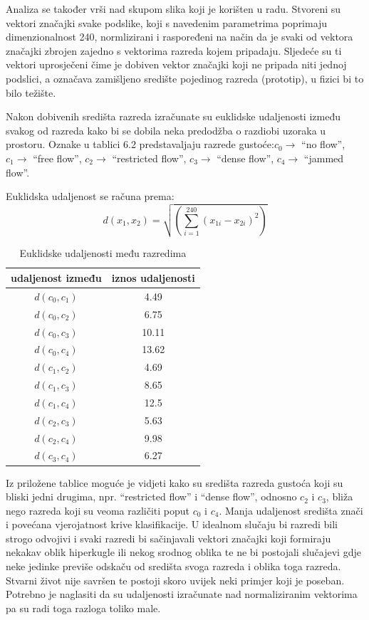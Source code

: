 \documentclass[times, utf8, zavrsni, numeric]{fer}
\begin{document}
Analiza se također vrši nad skupom slika koji je korišten u radu. Stvoreni su vektori
značajki svake podslike, koji s navedenim parametrima poprimaju dimenzionalnost 240, 
normlizirani i raspoređeni na način da je svaki
od vektora značajki zbrojen zajedno s vektorima razreda kojem pripadaju.
Sljedeće su ti vektori uprosječeni čime je dobiven vektor značajki 
koji ne pripada niti jednoj podslici, a označava zamišljeno središte
pojedinog razreda (prototip), u fizici bi to bilo težište. 

\bigbreak

Nakon dobivenih središta razreda izračunate su euklidske udaljenosti između svakog
od razreda kako bi se dobila neka predodžba o razdiobi uzoraka u prostoru. 
Oznake u tablici 6.2 predstavaljaju razrede gustoće:\( c_0 \rightarrow \) \enquote{no flow},
\( c_1 \rightarrow \) \enquote{free flow}, \( c_2 \rightarrow \) \enquote{restricted flow}, 
\( c_3 \rightarrow \) \enquote{dense flow}, \( c_4 \rightarrow \) \enquote{jammed flow}.

Euklidska udaljenost se računa prema:
\[
d(x_1, x_2) = \sqrt{\left(\sum_{i=1}^{240} \left(x_{1i}-x_{2i}\right)^2\right)}
\]

\begin{table}[ht]
\centering
\begin{tabular}{c|c}
udaljenost između & iznos udaljenosti \\
\hline
\(d(c_0, c_1)\) & 4.49 \\
\(d(c_0, c_2)\) & 6.75 \\
\(d(c_0, c_3)\) & 10.11 \\
\(d(c_0, c_4)\) & 13.62 \\
\(d(c_1, c_2)\) & 4.69 \\
\(d(c_1, c_3)\) & 8.65 \\
\(d(c_1, c_4)\) & 12.5 \\
\(d(c_2, c_3)\) & 5.63 \\
\(d(c_2, c_4)\) & 9.98 \\
\(d(c_3, c_4)\) & 6.27
\end{tabular}
\caption{Euklidske udaljenosti među razredima} 
\end{table}

Iz priložene tablice moguće je vidjeti kako su središta razreda gustoća koji su bliski jedni drugima, npr.
\enquote{restricted flow} i \enquote{dense flow}, odnosno \(c_2\) i \(c_3\), bliža 
nego razreda koji su veoma različiti poput \(c_0\) i \(c_4\). Manja udaljenost središta znači
i povećana vjerojatnost krive klasifikacije. U idealnom slučaju bi razredi bili strogo odvojivi
i svaki razredi bi sačinjavali vektori značajki koji formiraju nekakav oblik hiperkugle ili nekog srodnog oblika
te ne bi postojali slučajevi gdje neke jedinke previše odskaču od središta svoga razreda i oblika toga razreda.
Stvarni život nije savršen te postoji skoro uvijek neki primjer koji je poseban.  Potrebno je naglasiti da
su udaljenosti izračunate nad normaliziranim vektorima pa su radi toga razloga toliko male.
\end{document}
